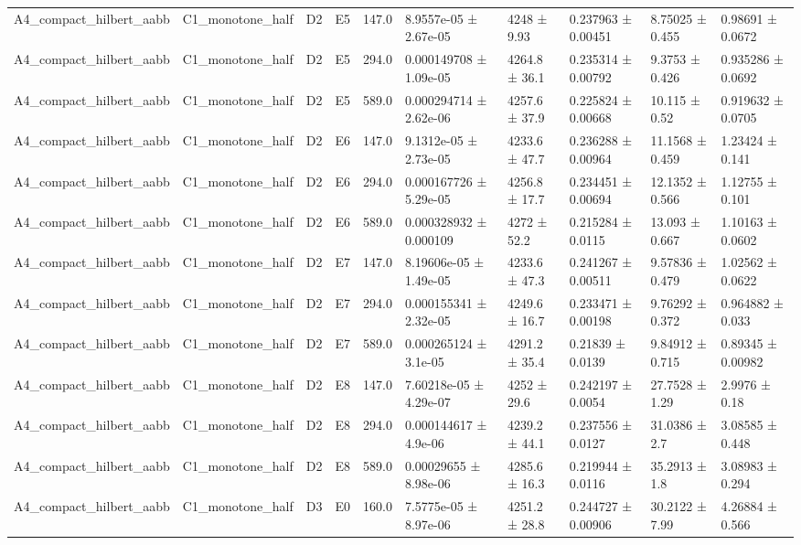 \begin{table}
\begin{tabular}{llllllllll}
A4\_compact\_hilbert\_aabb & C1\_monotone\_half & D2 & E5 & 147.0 & 8.9557e-05 ± 2.67e-05 & 4248 ± 9.93 & 0.237963 ± 0.00451 & 8.75025 ± 0.455 & 0.98691 ± 0.0672 \\
A4\_compact\_hilbert\_aabb & C1\_monotone\_half & D2 & E5 & 294.0 & 0.000149708 ± 1.09e-05 & 4264.8 ± 36.1 & 0.235314 ± 0.00792 & 9.3753 ± 0.426 & 0.935286 ± 0.0692 \\
A4\_compact\_hilbert\_aabb & C1\_monotone\_half & D2 & E5 & 589.0 & 0.000294714 ± 2.62e-06 & 4257.6 ± 37.9 & 0.225824 ± 0.00668 & 10.115 ± 0.52 & 0.919632 ± 0.0705 \\
A4\_compact\_hilbert\_aabb & C1\_monotone\_half & D2 & E6 & 147.0 & 9.1312e-05 ± 2.73e-05 & 4233.6 ± 47.7 & 0.236288 ± 0.00964 & 11.1568 ± 0.459 & 1.23424 ± 0.141 \\
A4\_compact\_hilbert\_aabb & C1\_monotone\_half & D2 & E6 & 294.0 & 0.000167726 ± 5.29e-05 & 4256.8 ± 17.7 & 0.234451 ± 0.00694 & 12.1352 ± 0.566 & 1.12755 ± 0.101 \\
A4\_compact\_hilbert\_aabb & C1\_monotone\_half & D2 & E6 & 589.0 & 0.000328932 ± 0.000109 & 4272 ± 52.2 & 0.215284 ± 0.0115 & 13.093 ± 0.667 & 1.10163 ± 0.0602 \\
A4\_compact\_hilbert\_aabb & C1\_monotone\_half & D2 & E7 & 147.0 & 8.19606e-05 ± 1.49e-05 & 4233.6 ± 47.3 & 0.241267 ± 0.00511 & 9.57836 ± 0.479 & 1.02562 ± 0.0622 \\
A4\_compact\_hilbert\_aabb & C1\_monotone\_half & D2 & E7 & 294.0 & 0.000155341 ± 2.32e-05 & 4249.6 ± 16.7 & 0.233471 ± 0.00198 & 9.76292 ± 0.372 & 0.964882 ± 0.033 \\
A4\_compact\_hilbert\_aabb & C1\_monotone\_half & D2 & E7 & 589.0 & 0.000265124 ± 3.1e-05 & 4291.2 ± 35.4 & 0.21839 ± 0.0139 & 9.84912 ± 0.715 & 0.89345 ± 0.00982 \\
A4\_compact\_hilbert\_aabb & C1\_monotone\_half & D2 & E8 & 147.0 & 7.60218e-05 ± 4.29e-07 & 4252 ± 29.6 & 0.242197 ± 0.0054 & 27.7528 ± 1.29 & 2.9976 ± 0.18 \\
A4\_compact\_hilbert\_aabb & C1\_monotone\_half & D2 & E8 & 294.0 & 0.000144617 ± 4.9e-06 & 4239.2 ± 44.1 & 0.237556 ± 0.0127 & 31.0386 ± 2.7 & 3.08585 ± 0.448 \\
A4\_compact\_hilbert\_aabb & C1\_monotone\_half & D2 & E8 & 589.0 & 0.00029655 ± 8.98e-06 & 4285.6 ± 16.3 & 0.219944 ± 0.0116 & 35.2913 ± 1.8 & 3.08983 ± 0.294 \\
A4\_compact\_hilbert\_aabb & C1\_monotone\_half & D3 & E0 & 160.0 & 7.5775e-05 ± 8.97e-06 & 4251.2 ± 28.8 & 0.244727 ± 0.00906 & 30.2122 ± 7.99 & 4.26884 ± 0.566 \\

\end{tabular}
\end{table}
